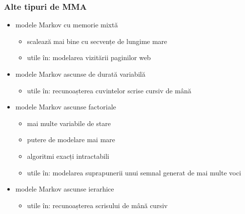 \begin{frame}
  \frametitle{Alte tipuri de MMA}
  \begin{itemize}
  \item modele Markov cu memorie mixtă \citep{Saul:1999:MMM:326214.325611}
    \begin{itemize}
    \item scalează mai bine cu secvențe de lungime mare
    \item utile în: modelarea vizitării paginilor web
    \end{itemize}
    \vspace*{.5em}
  \item modele Markov ascunse de durată variabilă \citep{rabiner1989tutorial}
    \begin{itemize}
    \item utile în: recunoașterea cuvintelor scrise cursiv de mână \citep{chen1995variable}
    \end{itemize}
    \vspace*{.5em}
  \item modele Markov ascunse factoriale \citep{Ghahramani97factorialhidden}
    \begin{itemize}
    \item mai multe variabile de stare
    \item putere de modelare mai mare
    \item algoritmi exacți intractabili
    \item utile în: modelarea suprapunerii unui semnal generat de mai multe voci
    \end{itemize}
    \vspace*{.5em}
  \item modele Markov ascunse ierarhice \citep{fine1998hierarchical}
    \begin{itemize}
    \item utile în: recunoașterea scrisului de mână cursiv
    \end{itemize}
  \end{itemize}
\end{frame}